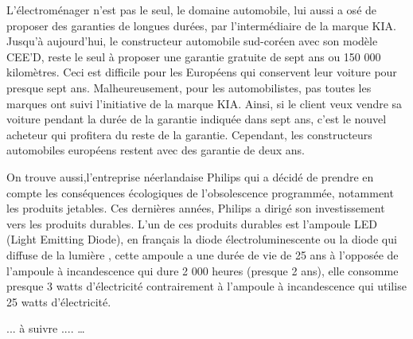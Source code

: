 L’électroménager n'est pas le seul, le domaine automobile, lui aussi a osé de proposer  des garanties de longues durées, par l’intermédiaire de la marque KIA. Jusqu’à aujourd'hui, le constructeur automobile sud-coréen avec son modèle CEE’D, reste le seul à proposer une garantie gratuite de sept ans ou 150 000 kilomètres. Ceci est difficile pour les Européens qui conservent leur voiture pour presque sept ans. Malheureusement, pour les automobilistes, pas toutes les marques ont suivi l’initiative de la marque KIA. Ainsi, si le client veux vendre sa voiture pendant la durée de la garantie indiquée dans sept ans, c'est le nouvel acheteur qui profitera du reste de la garantie. Cependant, les constructeurs automobiles européens restent avec des garantie de deux ans.

On trouve aussi,l'entreprise néerlandaise Philips qui a décidé de prendre en compte les conséquences écologiques de l'obsolescence programmée, notamment les produits jetables. Ces dernières années, Philips a dirigé son investissement vers  les produits durables. L'un de ces produits durables est l’ampoule LED (Light Emitting Diode), en français la diode électroluminescente ou la diode qui  diffuse de la lumière , cette ampoule a une durée de vie de 25 ans à l'opposée de l'ampoule à incandescence qui dure 2 000 heures (presque 2 ans), elle consomme presque 3 watts d’électricité contrairement à l'ampoule à incandescence qui utilise 25 watts d’électricité. 

... à suivre ....
… 
